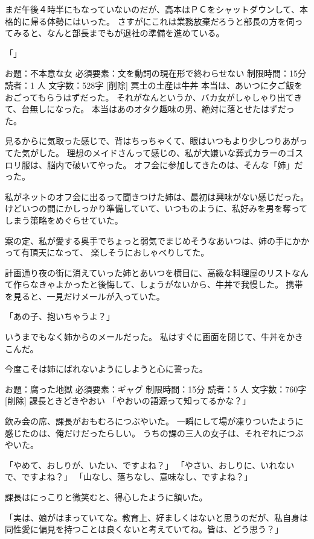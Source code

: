 まだ午後４時半にもなっていないのだが、高本はＰＣをシャットダウンして、本格的に帰る体勢にはいった。
さすがにこれは業務放棄だろうと部長の方を伺ってみると、なんと部長までもが退社の準備を進めている。

「」




 お題：不本意な女 必須要素：文を動詞の現在形で終わらせない 制限時間：15分 読者：1 人 文字数：528字
[削除]
冥土の土産は牛丼
本当は、あいつに夕ご飯をおごってもらうはずだった。
それがなんというか、バカ女がしゃしゃり出てきて、台無しになった。
本当はあのオタク趣味の男、絶対に落とせたはずだった。

見るからに気取った感じで、背はちっちゃくて、眼はいつもより少しつりあがってた気がした。
理想のメイドさんって感じの、私が大嫌いな葬式カラーのゴスロリ服は、脳内で破いてやった。
オフ会に参加してきたのは、そんな「姉」だった。

私がネットのオフ会に出るって聞きつけた姉は、最初は興味がない感じだった。
けどいつの間にかしっかり準備していて、いつものように、私好みを男を奪ってしまう策略をめぐらせていた。

案の定、私が愛する奥手でちょっと弱気でまじめそうなあいつは、姉の手にかかって有頂天になって、
楽しそうにおしゃべりしてた。

計画通り夜の街に消えていった姉とあいつを横目に、高級な料理屋のリストなんて作らなきゃよかったと後悔して、しょうがないから、牛丼で我慢した。
携帯を見ると、一見だけメールが入っていた。

「あの子、抱いちゃうよ？」

いうまでもなく姉からのメールだった。
私はすぐに画面を閉じて、牛丼をかきこんだ。

今度こそは姉にばれないようにしようと心に誓った。



 お題：腐った地獄 必須要素：ギャグ 制限時間：15分 読者：5 人 文字数：760字
[削除]
課長ときどきやおい
「やおいの語源って知ってるかな？」

飲み会の席、課長がおもむろにつぶやいた。
一瞬にして場が凍りついたように感じたのは、俺だけだったらしい。
うちの課の三人の女子は、それぞれにつぶやいた。

「やめて、おしりが、いたい、ですよね？」
「やさい、おしりに、いれないで、ですよね？」
「山なし、落ちなし、意味なし、ですよね？」

課長はにっこりと微笑むと、得心したように頷いた。

「実は、娘がはまっていてな。教育上、好ましくはないと思うのだが、私自身は同性愛に偏見を持つことは良くないと考えていてね。皆は、どう思う？」

